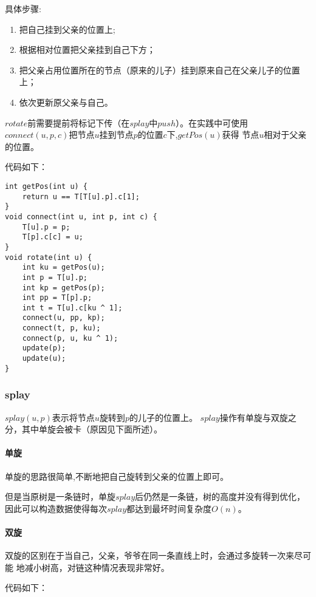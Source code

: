 具体步骤:
\begin{enumerate}
	\item 把自己挂到父亲的位置上;
	\item 根据相对位置把父亲挂到自己下方；
	\item 把父亲占用位置所在的节点（原来的儿子）挂到原来自己在父亲儿子的位置上；
	\item 依次更新原父亲与自己。
\end{enumerate}

$rotate$前需要提前将标记下传（在$splay$中$push$）。在实践中可使用\\
$connect(u,p,c)$把节点$u$挂到节点$p$的位置$c$下,$getPos(u)$获得
节点$u$相对于父亲的位置。

代码如下：

\begin{lstlisting}[title=rotate]
int getPos(int u) {
    return u == T[T[u].p].c[1];
}
void connect(int u, int p, int c) {
    T[u].p = p;
    T[p].c[c] = u;
}
void rotate(int u) {
    int ku = getPos(u);
    int p = T[u].p;
    int kp = getPos(p);
    int pp = T[p].p;
    int t = T[u].c[ku ^ 1];
    connect(u, pp, kp);
    connect(t, p, ku);
    connect(p, u, ku ^ 1);
    update(p);
    update(u);
}
\end{lstlisting}

\subsubsection{splay}

$splay(u,p)$表示将节点$u$旋转到$p$的儿子的位置上。
$splay$操作有单旋与双旋之分，其中单旋会被卡（原因见下面所述）。

\paragraph{单旋}

单旋的思路很简单,不断地把自己旋转到父亲的位置上即可。

但是当原树是一条链时，单旋$splay$后仍然是一条链，树的高度并没有得到优化，
因此可以构造数据使得每次$splay$都达到最坏时间复杂度$O(n)$。

\paragraph{双旋}

双旋的区别在于当自己，父亲，爷爷在同一条直线上时，会通过多旋转一次来尽可能
地减小树高，对链这种情况表现非常好。

代码如下：

